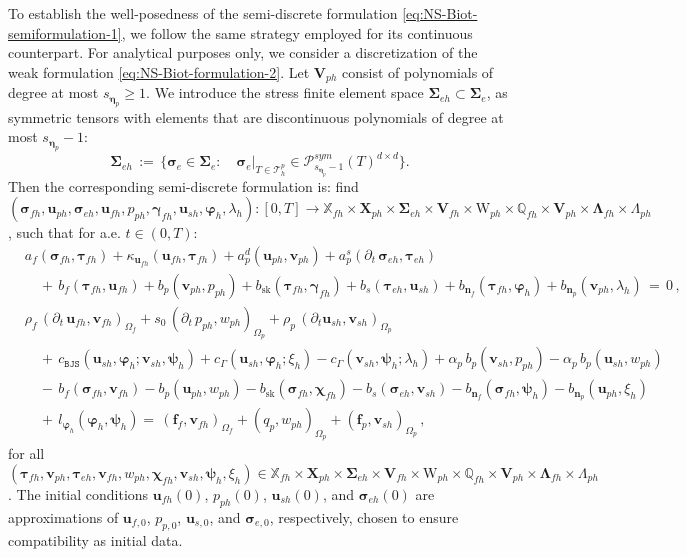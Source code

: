 \documentclass[11pt]{article}
\numberwithin{equation}{section}
\newcommand{\bgamma}{{\boldsymbol\gamma}}
\newcommand{\bLambda}{{\boldsymbol\Lambda}}
\newcommand{\bbeta}{{\boldsymbol\eta}}
\newcommand{\bsi}{{\boldsymbol\sigma}}
\newcommand{\bSigma}{{\boldsymbol\Sigma}}
\newcommand{\bvarphi}{{\boldsymbol\varphi}}
\newcommand{\bpsi}{{\boldsymbol\psi}}
\newcommand{\btau}{{\boldsymbol\tau}}
\newcommand{\bchi}{{\boldsymbol\chi}}
\newcommand{\bv}{{\mathbf{v}}}
\newcommand{\f}{\mathbf{f}}
\newcommand{\bu}{\mathbf{u}}
\newcommand{\bn}{{\mathbf{n}}}
\newcommand{\0}{{\mathbf{0}}}
\def\bX{\mathbf{X}}
\def\bV{\mathbf{V}}
\newcommand\bbQ{\mathbb{Q}}
\newcommand\bbX{\mathbb{X}}
\newcommand{\cT}{\mathcal{T}}
\newcommand{\cP}{\mathcal{P}}
\def\W{\mathrm{W}}
\def\BJS{\mathtt{BJS}}
\def\sk{\mathrm{sk}}
\numberwithin{equation}{section}
\begin{document}
To establish the well-posedness of the semi-discrete formulation \eqref{eq:NS-Biot-semiformulation-1}, we follow the same strategy employed for its continuous counterpart.
For analytical purposes only, we consider a discretization of the weak formulation \eqref{eq:NS-Biot-formulation-2}.
Let $\bV_{ph}$ consist of polynomials of degree at most $s_{\bbeta_p}\geq 1$. We introduce the stress finite element space $\bSigma_{eh} \subset \bSigma_e$, as symmetric tensors with elements that are discontinuous polynomials of degree at most $s_{\bbeta_p}-1$:
\begin{equation*}
\bSigma_{eh} \,:=\, \Big\{ \bsi_e\in \bSigma_{e} :\quad\bsi_e|_{T\in \cT_h^p}\in \cP^{sym}_{s_{\bbeta_p}-1}(T)^{d\times d} \Big\}.
\end{equation*}
Then the corresponding semi-discrete formulation is: find $(\bsi_{fh}, \bu_{ph}, \bsi_{eh}, \bu_{fh}, p_{ph}, \bgamma_{fh}, \bu_{sh}, \bvarphi_{h}, \lambda_{h}) : [0,T]\to \bbX_{fh}\times \bX_{ph}\times \bSigma_{eh}\times \bV_{fh}\times \W_{ph}\times \bbQ_{fh}\times \bV_{ph}\times \bLambda_{fh}\times \Lambda_{ph}$, such that for a.e. $t\in (0,T)$:
\begin{align}
& a_f(\bsi_{fh},\btau_{fh}) + \kappa_{\bu_{fh}}(\bu_{fh}, \btau_{fh}) + a^d_p(\bu_{ph},\bv_{ph}) + a^s_p(\partial_t\,\bsi_{eh},\btau_{eh}) \nonumber\\ 
&\quad +\, b_f(\btau_{fh},\bu_{fh}) + b_p(\bv_{ph},p_{ph}) + b_\sk(\btau_{fh},\bgamma_{fh})
+ b_s(\btau_{eh},\bu_{sh}) + b_{\bn_f}(\btau_{fh},\bvarphi_{h}) + b_{\bn_p}(\bv_{ph},\lambda_{h})  
\,=\, 0\,, \nonumber\\ 
& \rho_f\,(\partial_t\,\bu_{fh},\bv_{fh})_{\Omega_f} + s_0\,(\partial_t\,p_{ph},w_{ph})_{\Omega_p}
+ \rho_p\,(\partial_t\bu_{sh},\bv_{sh})_{\Omega_p} \nonumber\\ 
&\quad +\, c_{\BJS}(\bu_{sh},\bvarphi_{h};\bv_{sh},\bpsi_{h}) + c_{\Gamma}(\bu_{sh},\bvarphi_{h};\xi_{h}) - c_{\Gamma}(\bv_{sh},\bpsi_{h};\lambda_{h}) 
+ \alpha_p\,b_p(\bv_{sh},p_{ph}) - \alpha_p\,b_p(\bu_{sh},w_{ph}) \nonumber\\  
&\quad -\, b_f(\bsi_{fh},\bv_{fh}) - b_p(\bu_{ph},w_{ph}) - b_\sk(\bsi_{fh},\bchi_{fh})  
- b_s(\bsi_{eh},\bv_{sh}) - b_{\bn_f}(\bsi_{fh},\bpsi_{h}) - b_{\bn_p}(\bu_{ph},\xi_{h}) \nonumber\\  
&\quad +\, l_{\bvarphi_{h}}(\bvarphi_{h},\bpsi_{h}) =\, (\f_f,\bv_{fh})_{\Omega_f} + (q_p,w_{ph})_{\Omega_p} + (\f_p,\bv_{sh})_{\Omega_p}\,, 
\label{eq:NS-Biot-semi-formulation-2}
\end{align}
for all
$(\btau_{fh}, \bv_{ph}, \btau_{eh}, \bv_{fh}, w_{ph}, \bchi_{fh}, \bv_{sh}, \bpsi_{h}, \xi_{h})\in \bbX_{fh}\times \bX_{ph}\times \bSigma_{eh}\times \bV_{fh}\times \W_{ph}\times \bbQ_{fh}\times \bV_{ph}\times \bLambda_{fh}\times \Lambda_{ph}$. 
The initial conditions $\bu_{fh}(0)$, $p_{ph}(0)$, $\bu_{sh}(0)$, and $\bsi_{eh}(0)$ are approximations of $\bu_{f,0}$, $p_{p,0}$, $\bu_{s,0}$, and $\bsi_{e,0}$, respectively, chosen to ensure compatibility as initial data.
\end{document}
